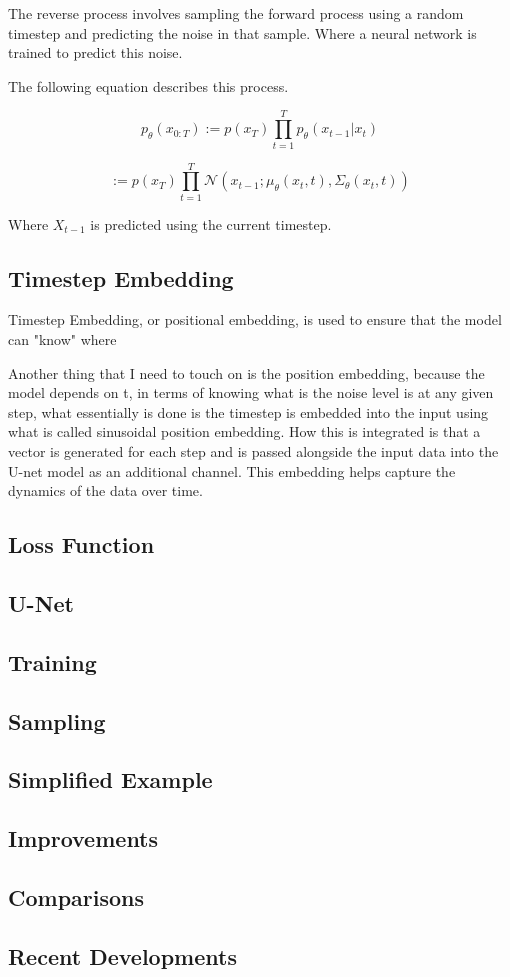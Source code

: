\documentclass[conference]{IEEEtran}
\begin{document}
The reverse process involves sampling the forward process using a random timestep and predicting the noise in that sample. Where a neural network is trained to predict this noise.

The following equation describes this process.

$$
    p_{\theta}(x_{0:T})
    := p(x_{T}) \prod_{t=1}^T p_{\theta}(x_{t-1} | x_{t})
$$

$$
    := p(x_{T}) \prod_{t=1}^T \mathcal{N}(x_{t-1}; \mu_{\theta}(x_{t}, t), \Sigma_{\theta}(x_{t}, t))
$$

Where $X_{t-1}$ is predicted using the current timestep.

\subsection{Timestep Embedding}

Timestep Embedding, or positional embedding, is used to ensure that the model can "know" where 

Another thing that I need to touch on is the position embedding, because the model depends on t, in terms of knowing what is the noise level is at any given step, what essentially is done is the timestep is embedded into the input using what is called sinusoidal position embedding. How this is integrated is that a vector is generated for each step and is passed alongside the input data into the U-net model as an additional channel. This embedding helps capture the dynamics of the data over time.


\subsection{Loss Function}



\subsection{U-Net}

\subsection{Training}

\subsection{Sampling}

\subsection{Simplified Example}

\subsection{Improvements}

\subsection{Comparisons}

\subsection{Recent Developments}



\end{document}
